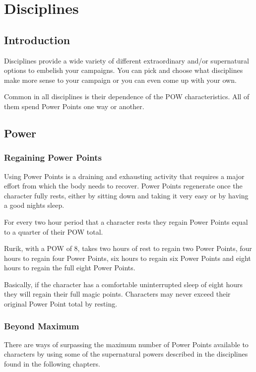 \chapter{Disciplines}
\label{ch:disciplines}

\section{Introduction}
Disciplines provide a wide variety of different extraordinary and/or supernatural options to embelish your campaigns. You can pick and choose what disciplines make more sense to your campaign or you can even come up with your own.

Common in all disciplines is their dependence of the POW characteristics. All of them spend Power Points one way or another.

\section{Power}

\subsection{Regaining Power Points}
Using Power Points is a draining and exhausting activity that requires a major effort from which the body needs to recover. Power Points regenerate once the character fully rests, either by sitting down and taking it very easy or by having a good nights sleep. 

For every two hour period that a character rests they regain Power Points equal to a quarter of their POW total.  

\begin{rpg-examplebox}
Rurik, with a POW of 8, takes two hours of rest to regain two Power Points, four hours to regain four Power Points, six hours to regain six Power Points and eight hours to regain the full eight Power Points. 
\end{rpg-examplebox}

Basically, if the character has a comfortable uninterrupted sleep of eight hours they will regain their full magic points. Characters may never exceed their original Power Point total by resting.

\subsection{Beyond Maximum}
There are ways of surpassing the maximum number of Power Points available to characters by using some of the supernatural powers described in the disciplines found in the following chapters.

